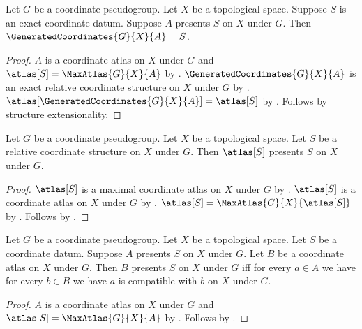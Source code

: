 \begin{theorem}\label{exact_presented_coordinates}
    Let $G$ be a coordinate pseudogroup.
    Let $X$ be a topological space.
    Suppose $S$ is an exact coordinate datum.
    Suppose $A$ presents $S$ on $X$ under $G$.
    Then $\GeneratedCoordinates{G}{X}{A}=S$.
\end{theorem}
\begin{proof}
    $A$ is a coordinate atlas on $X$ under $G$ and
        $\atlas[S]=\MaxAtlas{G}{X}{A}$ by .
    $\GeneratedCoordinates{G}{X}{A}$ is an exact relative coordinate structure
        on $X$ under $G$ by .
    $\atlas[\GeneratedCoordinates{G}{X}{A}]=\atlas[S]$ by
        .
    Follows by structure extensionality.
\end{proof}

\begin{theorem}\label{relative_atlas_presentation}
    Let $G$ be a coordinate pseudogroup.
    Let $X$ be a topological space.
    Let $S$ be a relative coordinate structure on $X$ under $G$.
    Then $\atlas[S]$ presents $S$ on $X$ under $G$.
\end{theorem}
\begin{proof}
    $\atlas[S]$ is a maximal coordinate atlas on $X$ under $G$ by
        .
    $\atlas[S]$ is a coordinate atlas on $X$ under $G$ by
        .
    $\atlas[S]=\MaxAtlas{G}{X}{\atlas[S]}$ by
        .
    Follows by .
\end{proof}

\begin{theorem}\label{same_coordinate_presentations_iff}
    Let $G$ be a coordinate pseudogroup.
    Let $X$ be a topological space.
    Let $S$ be a coordinate datum.
    Suppose $A$ presents $S$ on $X$ under $G$.
    Let $B$ be a coordinate atlas on $X$ under $G$.
    Then $B$ presents $S$ on $X$ under $G$ iff
        for every $a\in A$ we have for every $b\in B$ we have
            $a$ is compatible with $b$ on $X$ under $G$.
\end{theorem}
\begin{proof}
    $A$ is a coordinate atlas on $X$ under $G$ and
        $\atlas[S]=\MaxAtlas{G}{X}{A}$ by .
    Follows by .
\end{proof}

